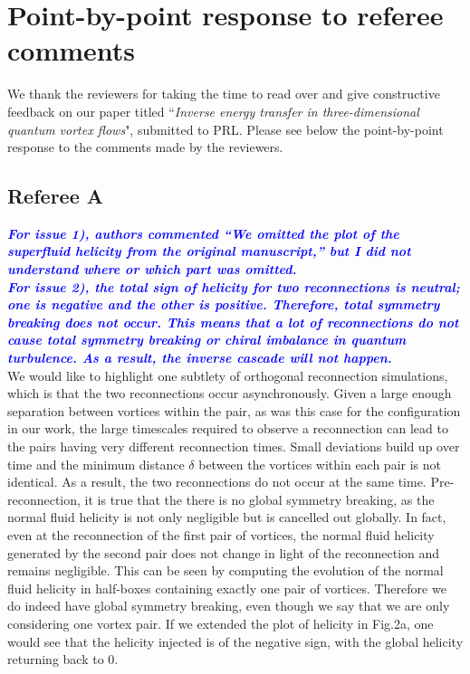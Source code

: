 \documentclass[a4paper,10pt]{article}
\def\blue#1{\textcolor{blue}{#1}}
\def\refcomment#1{\textbf{\blue{\emph{#1}}}\\}
\begin{document}
\section*{\centering Point-by-point response to referee comments}

We thank the reviewers for taking the time to read over and give constructive feedback on our paper titled “\emph{Inverse energy transfer in three-dimensional quantum vortex flows}", submitted to PRL. Please see below the point-by-point response to the comments made by the reviewers.

\subsection*{Referee A}

\refcomment{For issue 1), authors
commented “We omitted the plot of the superfluid helicity from the
original manuscript,” but I did not understand where or which part was
omitted.}

\refcomment{For issue 2), the total sign of helicity for two
reconnections is neutral; one is negative and the other is positive.
Therefore, total symmetry breaking does not occur. This means that a
lot of reconnections do not cause total symmetry breaking or chiral
imbalance in quantum turbulence. As a result, the inverse cascade will
not happen.}

We would like to highlight one subtlety of orthogonal reconnection simulations, which is that the two reconnections occur asynchronously. Given a large enough separation between vortices within the pair, as was this case for the configuration in our work, the large timescales required to observe a reconnection can lead to the pairs having very different reconnection times. Small deviations build up over time and the minimum distance $\delta$ between the vortices within each pair is not identical. As a result, the two reconnections do not occur at the same time. Pre-reconnection, it is true that the there is no global symmetry breaking, as the normal fluid helicity is not only negligible but is cancelled out globally. In fact, even at the reconnection of the first pair of vortices, the normal fluid helicity generated by the second pair does not change in light of the reconnection and remains negligible. This can be seen by computing the evolution of the normal fluid helicity in half-boxes containing exactly one pair of vortices. Therefore we do indeed have global symmetry breaking, even though we say that we are only considering one vortex pair. If we extended the plot of helicity in Fig.2a, one would see that the helicity injected is of the negative sign, with the global helicity returning back to 0. \\
\end{document}
